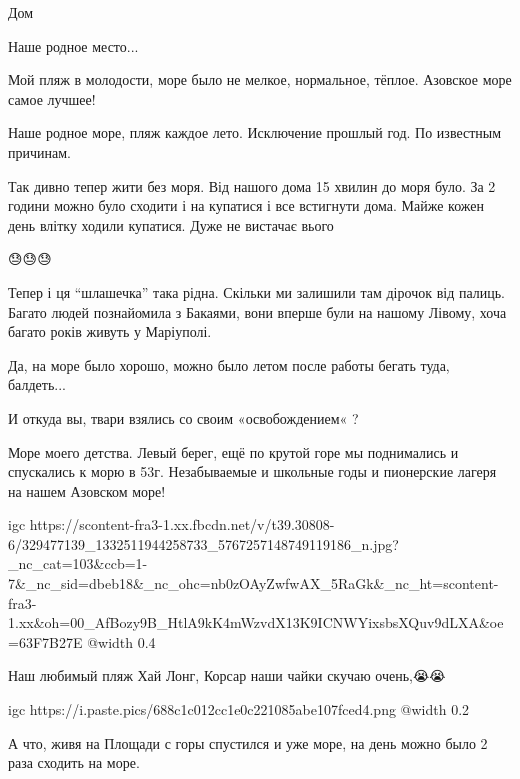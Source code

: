  
 
 
 
 

\qqSecCmt


Дом


Наше родное место...


Мой пляж в молодости, море было не мелкое, нормальное, тёплое. Азовское море самое лучшее!


Наше родное море, пляж каждое лето. Исключение прошлый год. По известным причинам.


Так дивно тепер жити без моря. Від нашого дома 15 хвилин до моря було. За 2
години можно було сходити і на купатися і все встигнути дома. Майже кожен день
влітку ходили купатися. Дуже не вистачає вього


😓😓😓


Тепер і ця \enquote{шлашечка} така рідна. Скільки ми залишили там дірочок від палиць.
Багато людей познайомила з Бакаями, вони вперше були на нашому Лівому, хоча
багато років живуть у Маріуполі.


Да, на море было хорошо, можно было летом после работы бегать туда, балдеть...


И откуда вы, твари взялись со своим «освобождением« ?


Море моего детства. Левый берег, ещё по крутой горе мы поднимались и спускались
к морю в 53г. Незабываемые и школьные годы и пионерские лагеря на нашем
Азовском море!

\ifcmt
  igc https://scontent-fra3-1.xx.fbcdn.net/v/t39.30808-6/329477139_1332511944258733_5767257148749119186_n.jpg?_nc_cat=103&ccb=1-7&_nc_sid=dbeb18&_nc_ohc=nb0zOAyZwfwAX_5RaGk&_nc_ht=scontent-fra3-1.xx&oh=00_AfBozy9B_HtlA9kK4mWzvdX13K9ICNWYixsbsXQuv9dLXA&oe=63F7B27E
	@width 0.4
\fi


Наш любимый пляж Хай Лонг, Корсар наши чайки скучаю очень,😭😭


\ifcmt
  igc https://i.paste.pics/688c1c012cc1e0c221085abe107fced4.png
	@width 0.2
\fi


А что, живя на Площади с горы спустился и уже море, на день можно было 2 раза
сходить на море.
